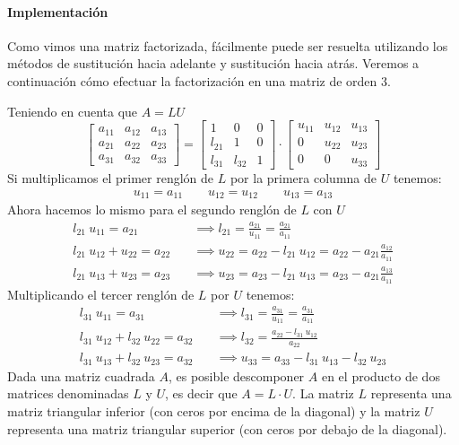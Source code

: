 \paragraph{Implementación}

Como vimos una matriz factorizada, fácilmente puede ser resuelta utilizando los métodos de sustitución hacia adelante y sustitución hacia atrás. Veremos a continuación cómo efectuar la factorización en una matriz de orden 3.

Teniendo en cuenta que \(A=LU\)
\[
\begin{bmatrix}
  a_{11} & a_{12} & a_{13} \\
  a_{21} & a_{22} & a_{23} \\
  a_{31} & a_{32} & a_{33}
\end{bmatrix} = \begin{bmatrix}
  1 & 0 & 0 \\
  l_{21} & 1 & 0 \\
  l_{31} & l_{32} & 1
\end{bmatrix} \cdot \begin{bmatrix}
  u_{11} & u_{12} & u_{13} \\
  0 & u_{22} & u_{23} \\
  0 & 0 & u_{33}
\end{bmatrix}
\]
Si multiplicamos el primer renglón de \(L\) por la primera columna de \(U\) tenemos:
\begin{align*}
  u_{11} = a_{11} \qquad u_{12} = u_{12} \qquad u_{13} = a_{13}
\end{align*}
Ahora hacemos lo mismo para el segundo renglón de \(L\) con \(U\)
\begin{align*}
  l_{21} ~ u_{11} = a_{21} \phantom{000} \quad &\implies l_{21} = \frac{a_{21}}{u_{11}}= \frac{a_{21}}{a_{11}}\\
  l_{21} ~ u_{12} + u_{22} = a_{22} \quad &\implies u_{22} = a_{22} - l_{21} ~ u_{12} = a_{22} - a_{21} \frac{a_{12}}{a_{11}} \\
  l_{21} ~ u_{13} + u_{23} = a_{23} \quad &\implies u_{23} = a_{23} - l_{21} ~ u_{13} = a_{23} - a_{21} \frac{a_{13}}{a_{11}}
\end{align*}
Multiplicando el tercer renglón de \(L\) por \(U\) tenemos:
\begin{align*}
  l_{31} ~ u_{11} = a_{31} \phantom{000} \quad &\implies l_{31} = \frac{a_{31}}{u_{11}}= \frac{a_{31}}{a_{11}}\\
  l_{31} ~ u_{12} + l_{32} ~ u_{22} = a_{32} \quad &\implies l_{32} = \frac{a_{22} - l_{31} ~ u_{12}}{a_{22}} \\
  l_{31} ~ u_{13} + l_{32} ~ u_{23} = a_{32} \quad &\implies u_{33} = a_{33} - l_{31} ~ u_{13} - l_{32} ~ u_{23}
\end{align*}
Dada una matriz cuadrada \(A\), es posible descomponer \(A\) en el producto de dos matrices denominadas \(L\) y \(U\), es decir que \(A=L\cdot U\). La matriz \(L\) representa una matriz triangular inferior (con ceros por encima de la diagonal) y la matriz \(U\) representa una matriz triangular superior (con ceros por debajo de la diagonal).

